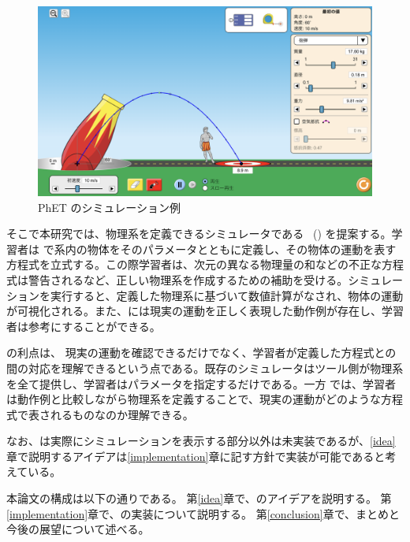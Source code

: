 \begin{figure}[thb]
\centering
\includegraphics*[width=0.9\linewidth]{figure/PhET_example.png}
\caption{PhET のシミュレーション例} \label{numeral_based}
\end{figure}

そこで本研究では、物理系を定義できるシミュレータである \simname~(\simnamealt) を提案する。学習者は \simname で系内の物体をそのパラメータとともに定義し、その物体の運動を表す方程式を立式する。この際学習者は、次元の異なる物理量の和などの不正な方程式は警告されるなど、正しい物理系を作成するための補助を受ける。シミュレーションを実行すると、定義した物理系に基づいて数値計算がなされ、物体の運動が可視化される。また、\simname には現実の運動を正しく表現した動作例が存在し、学習者は参考にすることができる。

\simname の利点は、
現実の運動を確認できるだけでなく、学習者が定義した方程式との間の対応を理解できるという点である。既存のシミュレータはツール側が物理系を全て提供し、学習者はパラメータを指定するだけである。一方 \simname では、学習者は動作例と比較しながら物理系を定義することで、現実の運動がどのような方程式で表されるものなのか理解できる。

なお、\simname は実際にシミュレーションを表示する部分以外は未実装であるが、\ref{idea}章で説明するアイデアは\ref{implementation}章に記す方針で実装が可能であると考えている。

本論文の構成は以下の通りである。
第\ref{idea}章で、\simname のアイデアを説明する。
第\ref{implementation}章で、\simname の実装について説明する。
第\ref{conclusion}章で、まとめと今後の展望について述べる。
